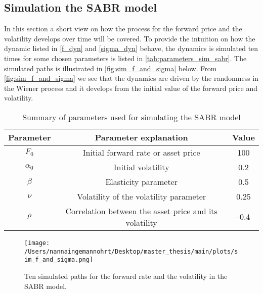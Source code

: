 \subsection{Simulation the SABR model}
In this section a short view on how the process for the forward price and the volatility develops over time will be covered. 
To provide the intuition on how the dynamic listed in \autoref{f_dyn} and \autoref{sigma_dyn} behave, the dynamics is simulated ten times
for some chosen parameters is listed in \autoref{tab:parameters_sim_sabr}. 
The simulated paths is illustrated in \autoref{fig:sim_f_and_sigma} below. 
From \autoref{fig:sim_f_and_sigma} we see that the dynamics are driven by the randomness in the Wiener process and 
it develops from the initial value of the forward price and volatility.
\begin{table}[H]
    \centering
    \begin{tabular}{ccc}
      \toprule
      \textbf{Parameter} & \textbf{Parameter explanation} & \textbf{Value} \\
      \midrule
      $F_0$ & Initial forward rate or asset price & 100 \\
      $\alpha_0$ & Initial volatility  & 0.2 \\
      $\beta$ & Elasticity parameter & 0.5 \\
      $\nu$ & Volatility of the volatility parameter & 0.25 \\
      $\rho$ & Correlation between the asset price and its volatility & -0.4 \\
      \bottomrule
    \end{tabular}
    \caption{Summary of parameters used for simulating the SABR model}
    \label{tab:parameters_sim_sabr}
\end{table}
\noindent

\begin{figure}[H]
    \centering
    \texttt{[image: /Users/nannaingemannohrt/Desktop/master\_thesis/main/plots/sim\_f\_and\_sigma.png]}
    \caption{Ten simulated paths for the forward rate and the volatility in the SABR model.}
    \label{fig:sim_f_and_sigma}
\end{figure}
\noindent
